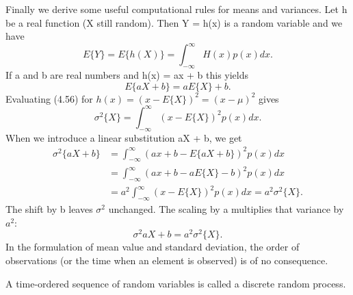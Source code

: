 Finally we derive some useful computational rules for means and variances. Let h
be a real function (X still random). Then Y = h(x) is a random variable and we have 
\begin{equation}
E\{Y\}=E\{h(X)\}=\int^\infty_{-\infty}H(x)p(x)dx.
\end{equation}
If a and b are real numbers and h(x) = ax + b this yields
\begin{equation}
E\{aX+b\}=aE\{X\}+b.
\end{equation}
Evaluating (4.56) for $h(x)=(x-E\{X\})^2=(x-\mu)^2$ gives
\begin{equation}
\sigma^2\{X\}=\int^\infty_{-\infty}(x-E\{X\})^2p(x)dx.
\end{equation}
When we introduce a linear substitution aX + b, we get
\begin{equation*}
\begin{split}
\sigma^2\{aX+b\}&=\int^\infty_{-\infty}(ax+b-E\{aX+b\})^2p(x)dx\\
&=\int^\infty_{-\infty}(ax+b-aE\{X\}-b)^2p(x)dx\\
&=a^2\int^\infty_{-\infty}(x-E\{X\})^2p(x)dx=a^2\sigma^2\{X\}.
\end{split}
\end{equation*}
The shift by b leaves $\sigma^2$ unchanged. The scaling by a multiplies that variance by $a^2$:
\begin{equation}
\sigma^2{aX+b}=a^2\sigma^2\{X\}.
\end{equation}
In the formulation of mean value and standard deviation, the order of observations
(or the time when an element is observed) is of no consequence.

A time-ordered sequence of random variables is called a discrete random process. 


